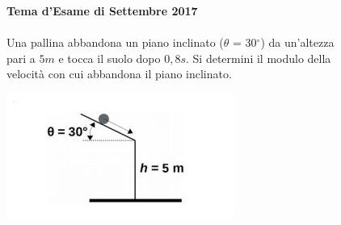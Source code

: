 \begin{figure}[h!]
\textbf{Tema d'Esame di Settembre 2017}\\ \\
Una pallina abbandona un piano inclinato ($\theta$ = 30$^{\circ}$) da un’altezza pari a $5 m$ e tocca il suolo dopo $0,8 s$. Si determini il modulo della velocità con cui abbandona il piano inclinato. 
\\
	\begin{center}
		\includegraphics[scale=1]{ES2/SET022017.jpg}
	\end{center}
\end{figure}